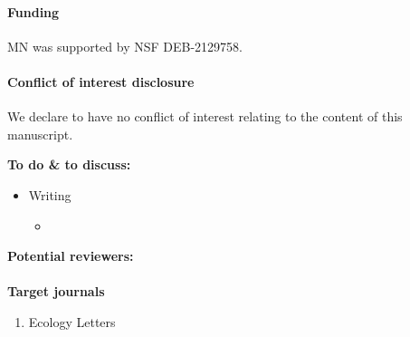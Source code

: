 \documentclass[11pt]{article}
\newenvironment{cover}{\maketitle}{\clearpage}
\begin{document}
\begin{cover}
\subsection{Funding}
MN was supported by NSF DEB-2129758.

\subsection{Conflict of interest disclosure}
We declare to have no conflict of interest relating to the content of this manuscript.
	
\end{cover}



\noindent
\textbf{To do \& to discuss:}
\begin{itemize}
		
	\item Writing
	\begin{itemize}
		\item 
	\end{itemize}

\end{itemize}

\noindent
\textbf{Potential reviewers:}\\\\

\noindent
\textbf{Target journals}
	\begin{enumerate}
		\item Ecology Letters
	\end{enumerate}


\clearpage
\thispagestyle{empty} 
\baselineskip12pt

\part{} %
\parttoc %


\doparttoc %
\faketableofcontents %
\end{document}
